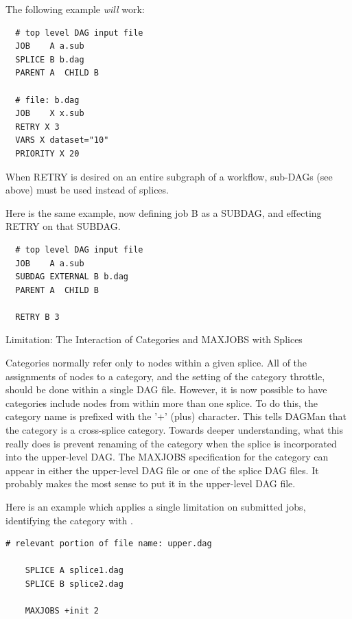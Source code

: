 The following example \emph{will} work:
\begin{verbatim}
  # top level DAG input file
  JOB    A a.sub
  SPLICE B b.dag
  PARENT A  CHILD B

  # file: b.dag
  JOB    X x.sub
  RETRY X 3
  VARS X dataset="10"
  PRIORITY X 20
\end{verbatim}

When RETRY is desired on an entire subgraph of a workflow,
sub-DAGs (see above) must be used instead of splices.

Here is the same example, now defining job B as a SUBDAG,
and effecting RETRY on that SUBDAG.
\begin{verbatim}
  # top level DAG input file
  JOB    A a.sub
  SUBDAG EXTERNAL B b.dag
  PARENT A  CHILD B

  RETRY B 3
\end{verbatim}

\begin{description}
\item[Limitation: The Interaction of Categories and MAXJOBS with Splices]
\end{description}

Categories normally refer only to nodes within a
given splice.
All of the assignments of nodes to a category, and the
setting of the category throttle, should be done within a single DAG file.
However, it is now possible to have categories include nodes
from within more than one splice.
To do this, the category name is prefixed with the '+' (plus) character.
This tells DAGMan that the category is
a cross-splice category.
Towards deeper understanding,
what this really does is prevent renaming
of the category when the splice is incorporated into the upper-level DAG.
The MAXJOBS specification for the category can appear in either the
upper-level DAG file or one of the splice DAG files.
It probably
makes the most sense to put it in the upper-level DAG file.

Here is an example which applies a single limitation on submitted jobs,
identifying the category with . 

\begin{verbatim}
# relevant portion of file name: upper.dag

    SPLICE A splice1.dag
    SPLICE B splice2.dag

    MAXJOBS +init 2
\end{verbatim}

